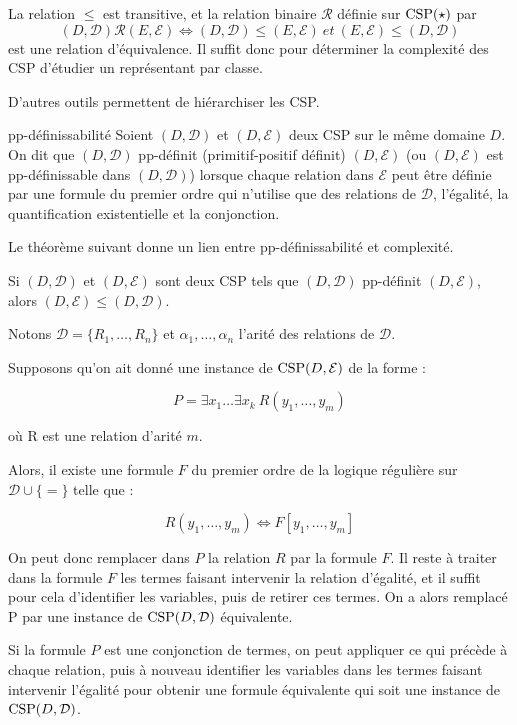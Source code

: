 \begin{prop}
    La relation $\leq$ est transitive, et la relation binaire $\mathcal{R}$ définie
    sur $\text{CSP} (\star)$ par $$(D,\mathcal{D}) \mathcal{R} (E,\mathcal{E}) \iff
    (D,\mathcal{D}) \leq (E,\mathcal{E}) \ et \ (E,\mathcal{E}) \leq
    (D,\mathcal{D})$$ est une relation d'équivalence. Il suffit donc pour
    déterminer la complexité des CSP d'étudier un représentant par classe.
\end{prop}

D'autres outils permettent de hiérarchiser les CSP.

\begin{defi}{pp-définissabilité}
    Soient $(D,\mathcal{D})$ et $(D,\mathcal{E})$ deux CSP sur le même domaine $D$.
    On dit que $(D,\mathcal{D})$ pp-définit (primitif-positif définit)
    $(D,\mathcal{E})$ (ou $(D,\mathcal{E})$ est pp-définissable dans
    $(D,\mathcal{D})$) lorsque chaque relation dans $\mathcal{E}$ peut être
    définie par une formule du premier ordre qui n'utilise que des relations de
    $\mathcal{D}$, l'égalité, la quantification existentielle et la
    conjonction.
\end{defi}

Le théorème suivant donne un lien entre pp-définissabilité et complexité.

\begin{theo}{}
    Si  $(D,\mathcal{D})$ et $(D,\mathcal{E})$ sont deux CSP tels que
    $(D,\mathcal{D})$ pp-définit $(D,\mathcal{E})$, alors $(D,\mathcal{E}) \leq
    (D,\mathcal{D})$.
\end{theo}

\begin{pv}
    Notons $\mathcal{D} = \{R_1,\dots,R_n\}$ et $\alpha_1,\dots,\alpha_n$ l'arité
    des relations de $\mathcal{D}$. 

    Supposons qu'on ait donné une instance de $\text{CSP} (D,\mathcal{E})$ de la forme :

    $$P = \exists x_1 \dots \exists x_k \ R(y_1,\dots,y_m)$$

    où R est une relation d'arité $m$.

    Alors, il existe une formule $F$ du premier ordre de la logique régulière sur
    $\mathcal{D} \cup \{=\}$ telle que :

    $$ R(y_1,\dots,y_m) \iff F[y_1,\dots,y_m]$$

    On peut donc remplacer dans $P$ la relation $R$ par la formule $F$. Il reste à
    traiter dans la formule $F$ les termes faisant intervenir la relation
    d'égalité, et il suffit pour cela d'identifier les variables, puis de
    retirer ces termes. On a alors remplacé P par une instance de $\text{CSP}
    (D,\mathcal{D})$ équivalente.

    Si la formule $P$ est une conjonction de termes, on peut appliquer ce qui
    précède à chaque relation, puis à nouveau identifier les variables dans les
    termes faisant intervenir l'égalité pour obtenir une formule équivalente
    qui soit une instance de $\text{CSP} (D,\mathcal{D})$. 
\end{pv}

